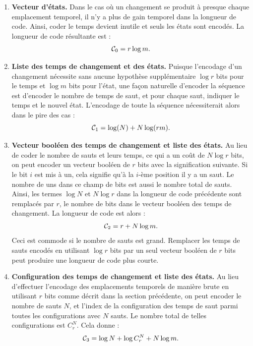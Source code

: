 \documentclass[11pt,a4paper]{article}
\def \CR {{\cal C}}
\begin{document}
	\begin{enumerate}
		\item \textbf{Vecteur d'états.} Dans le cas où un changement se produit à presque chaque emplacement temporel, il n'y a plus de gain temporel dans la longueur de code. Ainsi, coder le temps devient inutile et seuls les états sont encodés. La longueur de code résultante est :
		\begin{equation}
			\CR_0 = r\log m.
		\end{equation}
		
		\item \textbf{Liste des temps de changement et des états.} Puisque l'encodage d'un changement nécessite sans aucune hypothèse supplémentaire $\log r$ bits pour le temps et $\log m$ bits pour l'état, une façon naturelle d'encoder la séquence est d'encoder le nombre de temps de saut, et pour chaque saut, indiquer le temps et le nouvel état. L'encodage de toute la séquence nécessiterait alors dans le pire des cas :
		\begin{equation}
			\CR_1 = \log(N) + N\log(rm).
		\end{equation}
		
		\item \textbf{Vecteur booléen des temps de changement et liste des états.} Au lieu de coder le nombre de sauts et leurs temps, ce qui a un coût de $N\log r$ bits, on peut encoder un vecteur booléen de $r$ bits avec la signification suivante. Si le bit $i$ est mis à un, cela signifie qu'à la $i$-ème position il y a un saut. Le nombre de uns dans ce champ de bits est aussi le nombre total de sauts. Ainsi, les termes $\log N$ et $N\log r$ dans la longueur de code précédente sont remplacés par $r$, le nombre de bits dans le vecteur booléen des temps de changement. La longueur de code est alors :
		\begin{equation}
			\CR_2 = r + N\log m.
		\end{equation}
		Ceci est commode si le nombre de sauts est grand. Remplacer les temps de sauts encodés en utilisant $\log r$ bits par un seul vecteur booléen de $r$ bits peut produire une longueur de code plus courte.
		
		\item \textbf{Configuration des temps de changement et liste des états.} Au lieu d'effectuer l'encodage des emplacements temporels de manière brute en utilisant $r$ bits comme décrit dans la section précédente, on peut encoder le nombre de sauts $N$, et l'index de la configuration des temps de saut parmi toutes les configurations avec $N$ sauts. Le nombre total de telles configurations est $C_r^N$. Cela donne :
		\begin{equation}
			\CR_3 = \log N + \log C_r^{N} + N\log m.
		\end{equation}
	\end{enumerate}
	
\end{document}
